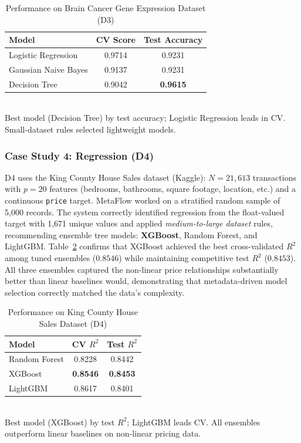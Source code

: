 \documentclass[conference]{IEEEtran}
\begin{document}
   \begin{table}[htbp]
   \centering
   \caption{Performance on Brain Cancer Gene Expression Dataset (D3)}
   \label{tab:d3_results}
   \small
   \begin{tabular}{lcc}
   \hline
   \textbf{Model} & \textbf{CV Score} & \textbf{Test Accuracy} \\
   \hline
   Logistic Regression & 0.9714 & 0.9231 \\
   Gaussian Naive Bayes & 0.9137 & 0.9231 \\
   Decision Tree & 0.9042 & \textbf{0.9615} \\
   \hline
   \end{tabular}\\
   {\scriptsize Best model (Decision Tree) by test accuracy; Logistic Regression leads in CV. Small-dataset rules selected lightweight models.}
   \end{table}

   \subsubsection{Case Study 4: Regression (D4)}
   D4 uses the King County House Sales dataset (Kaggle): $N=21{,}613$ transactions with $p=20$ features (bedrooms, bathrooms, square footage, location, etc.) and a continuous \texttt{price} target. MetaFlow worked on a stratified random sample of 5{,}000 records. The system correctly identified regression from the float-valued target with 1{,}671 unique values and applied \textit{medium-to-large dataset} rules, recommending ensemble tree models: \textbf{XGBoost}, Random Forest, and LightGBM.
   Table~\ref{tab:d4_results} confirms that XGBoost achieved the best cross-validated $R^2$ among tuned ensembles ($0.8546$) while maintaining competitive test $R^2$ ($0.8453$). All three ensembles captured the non-linear price relationships substantially better than linear baselines would, demonstrating that metadata-driven model selection correctly matched the data's complexity.

   \begin{table}[htbp]
   \centering
   \caption{Performance on King County House Sales Dataset (D4)}
   \label{tab:d4_results}
   \small
   \begin{tabular}{lcc}
   \hline
   \textbf{Model} & \textbf{CV $R^2$} & \textbf{Test $R^2$} \\
   \hline
   Random Forest & 0.8228 & 0.8442 \\
   XGBoost & \textbf{0.8546} & \textbf{0.8453} \\
   LightGBM & 0.8617 & 0.8401 \\
   \hline
   \end{tabular}\\
   {\scriptsize Best model (XGBoost) by test $R^2$; LightGBM leads CV. All ensembles outperform linear baselines on non-linear pricing data.}
   \end{table}
\end{document}
